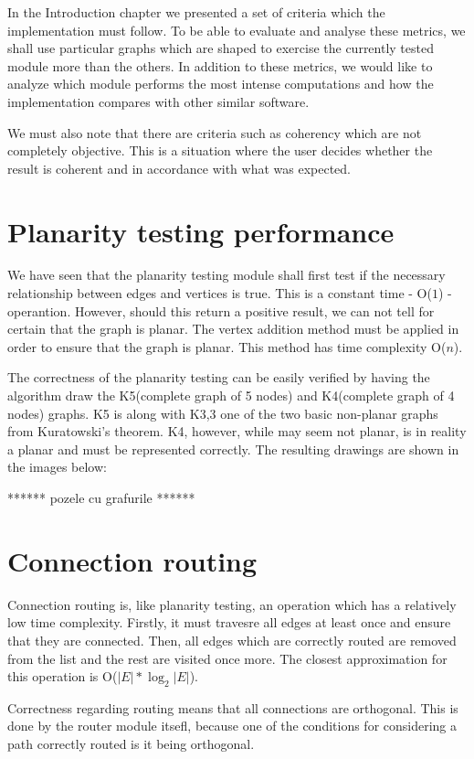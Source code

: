 In the Introduction chapter we presented a set of criteria which the implementation must follow.
To be able to evaluate and analyse these metrics, we shall use particular graphs which are shaped to exercise 
the currently tested module more than the others. In addition to these metrics, we would like to analyze 
which module performs the most intense computations and how the implementation compares with other 
similar software.

We must also note that there are criteria such as coherency which are not completely objective. This is a 
situation where the user decides whether the result is coherent and in accordance with what was expected.

\section{Planarity testing performance}

We have seen that the planarity testing module shall first test if the necessary relationship between 
edges and vertices is true. This is a constant time - O(${1}$) - operantion. However, should this 
return a positive result, we can not tell for certain that the graph is planar. The vertex addition method 
must be applied in order to ensure that the graph is planar. This method has time complexity O(${n}$).

The correctness of the planarity testing can be easily verified by having the algorithm draw the K5(complete 
graph of 5 nodes) and K4(complete graph of 4 nodes) graphs. K5 is along with K3,3 one of the two basic 
non-planar graphs from Kuratowski's theorem. K4, however, while may seem not planar, is in reality a planar 
and must be represented correctly. The resulting drawings are shown in the images below:

****** pozele cu grafurile ****** 

\section{Connection routing}

Connection routing is, like planarity testing, an operation which has a relatively low time complexity.
Firstly, it must travesre all edges at least once and ensure that they are connected. Then, all edges which 
are correctly routed are removed from the list and the rest are visited once more. The closest approximation 
for this operation is O($|E| * \log_2 |E|$).

Correctness regarding routing means that all connections are orthogonal. This is done by the router module 
itsefl, because one of the conditions for considering a path correctly routed is it being orthogonal.

